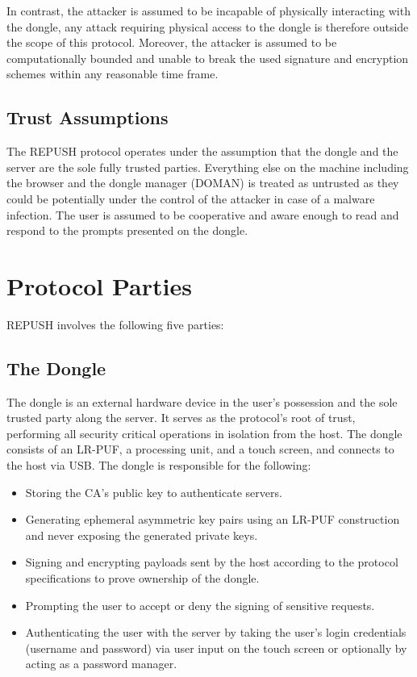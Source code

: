 In contrast, the attacker is assumed to be incapable of physically interacting with the dongle, any attack requiring physical access to the dongle is therefore outside the scope of this protocol. Moreover, the attacker is assumed to be computationally bounded and unable to break the used signature and encryption schemes within any reasonable time frame.

\subsection{Trust Assumptions}
The REPUSH protocol operates under the assumption that the dongle and the server are the sole fully trusted parties. Everything else on the machine including the browser and the dongle manager (DOMAN) is treated as untrusted as they could be potentially under the control of the attacker in case of a malware infection. The user is assumed to be cooperative and aware enough to read and respond to the prompts presented on the dongle. 

\section{Protocol Parties}
REPUSH involves the following five parties:
\subsection{The Dongle}
The dongle is an external hardware device in the user's possession and the sole trusted party along the server. It serves as the protocol's root of trust, performing all security critical operations in isolation from the host. The dongle consists of an LR-PUF, a processing unit, and a touch screen, and connects to the host via USB. The dongle is responsible for the following:
\begin{itemize}
    \item Storing the CA's public key to authenticate servers.
    \item Generating ephemeral asymmetric key pairs using an LR-PUF construction and never exposing the generated private keys.
    \item Signing and encrypting payloads sent by the host according to the protocol specifications to prove ownership of the dongle.
    \item Prompting the user to accept or deny the signing of sensitive requests.
    \item Authenticating the user with the server by taking the user's login credentials (username and password) via user input on the touch screen or optionally by acting as a password manager.
\end{itemize}


